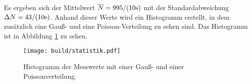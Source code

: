 
\noindent
Es ergeben sich der Mittelwert $\overline{N} = 995 /(10\unit[]{\second})$ mit der Standardabweichung $\Delta N = 43/(10\unit[]{\second})$.
Anhand dieser Werte wird ein Histogramm erstellt, in dem zusätzlich eine Gauß- und eine Poisson-Verteilung zu sehen sind.
Das Histogramm ist in Abbildung \ref{fig:stat} zu sehen.

\begin{figure}[H]
    \centering
    \texttt{[image: build/statistik.pdf]}
    \caption[]{Histogramm der Messwerte mit einer Gauß- und einer Poissonverteilung.}
    \label{fig:stat}
\end{figure}
 